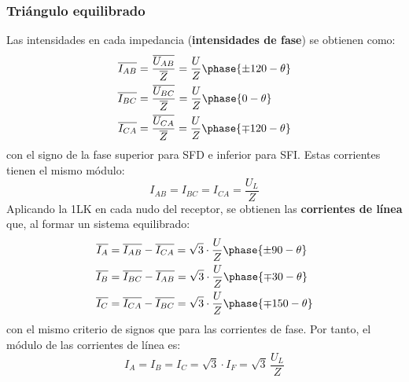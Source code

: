	\subsubsection{Triángulo equilibrado}
	Las intensidades en cada impedancia (\textbf{intensidades de fase}) se obtienen como: 
	\begin{align*}
          \overline{I_{AB}} &= \frac{\overline{U_{AB}}}{\overline{Z}} = \frac{U}{Z}\phase{{\pm 120} - \theta} \\
          \overline{I_{BC}} &= \frac{\overline{U_{BC}}}{\overline{Z}} = \frac{U}{Z}\phase{0 - \theta}\\
          \overline{I_{CA}} &= \frac{\overline{U_{CA}}}{\overline{Z}} = \frac{U}{Z}\phase{{\mp 120} - \theta}
    \end{align*}
    con el signo de la fase superior para SFD e inferior para SFI. Estas corrientes tienen el mismo módulo: 
    \begin{equation}
        \boxed{{I_{AB}}={I_{BC}}={I_{CA}} = \dfrac{U_L}{Z}}
    \end{equation}
    Aplicando la 1LK en cada nudo del receptor, se obtienen las \textbf{corrientes de línea} que, al formar un sistema equilibrado: 
    \begin{align}
      \overline{I_A} &= \overline{I_{AB}} - \overline{I_{CA}} = \sqrt{3} \cdot \frac{U}{Z}\phase{{\pm 90} - \theta}\\
      \overline{I_B} &= \overline{I_{BC}} - \overline{I_{AB}} = \sqrt{3} \cdot \frac{U}{Z}\phase{{\mp 30} - \theta}\\
      \overline{I_C} &= \overline{I_{CA}} - \overline{I_{BC}} = \sqrt{3} \cdot \frac{U}{Z}\phase{{\mp 150} - \theta}
    \end{align}
    con el mismo criterio de signos que para las corrientes de fase. Por tanto, el módulo de las corrientes de línea es: 
    \begin{equation}
        \boxed{{I}_A = {I}_B = {I}_C = \sqrt{3} \cdot I_F = \sqrt{3}\,\frac{U_L}{Z}}
    \end{equation}
	
